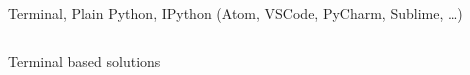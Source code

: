\documentclass[usepdftitle=false, aspectratio=169]{beamer}
\begin{document}
\begin{frame}
  {Terminal, Plain Python, IPython (Atom, VSCode, PyCharm, Sublime, \ldots)}


  \begin{columns}

    Terminal based solutions\\[.2em]
    \\[.2em]



\end{columns}
\end{frame}
\end{document}
